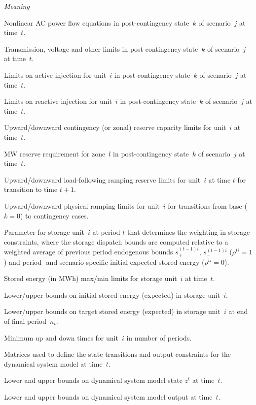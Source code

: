 \documentclass[12pt]{article}
\newcommand{\namelistlabel}[1]{\mbox{#1}\hfil}
\newenvironment{namelist}[1]{%
\begin{list}{}
  {
    \let\makelabel\namelistlabel
    \settowidth{\labelwidth}{#1}
    \setlength{\leftmargin}{1.1\labelwidth}
  }
 }{%
\end{list}}
\numberwithin{equation}{section}
\numberwithin{table}{section}
\numberwithin{figure}{section}
\begin{document}
\begin{namelist}{XXXXXXXXXX}
\item[]
\item[{\bf Constraint Functions and Parameters}]
\item[\emph{Symbol}] \emph{Meaning}
\item[$g^{tjk}(\cdot)$] Nonlinear AC power flow equations in post-contingency state~$k$ of scenario~$j$ at time~$t$.
\item[$h^{tjk}(\cdot)$] Transmission, voltage and other limits in post-contingency state~$k$ of scenario~$j$ at time~$t$.
\item[$P_{\rm min}^{tijk}, P_{\rm max}^{tijk}$] Limits on active injection for unit~$i$ in post-contingency state~$k$ of scenario~$j$ at time~$t$.
\item[$Q_{\rm min}^{tijk}, Q_{\rm max}^{tijk}$] Limits on reactive injection for unit~$i$ in post-contingency state~$k$ of scenario~$j$ at time~$t$.
\item[$R_{\rm max+}^{ti}, R_{\rm max-}^{ti}$] Upward/downward contingency (or zonal) reserve capacity limits for unit~$i$ at time~$t$.
\item[$R_l^{tjk}$] MW reserve requirement for zone~$l$ in post-contingency state~$k$ of scenario~$j$ at time~$t$.
\item[$\delta^{ti}_{\rm max+}, \delta^{ti}_{\rm max-}$] Upward/downward load-following ramping reserve limits for unit~$i$ at time $t$ for transition to time $t+1$.
\item[$\Delta_+^i, \Delta_-^i$] Upward/downward physical ramping limits for unit~$i$ for transitions from base ($k=0$) to contingency cases.
\item[$\rho^{ti}$] Parameter for storage unit~$i$ at period $t$ that determines the weighting in storage constraints, where the storage dispatch bounds are computed relative to a weighted average of previous period endogenous bounds $s_+^{(t-1)i}$, $s_-^{(t-1)i}$ ($\rho^{ti} = 1$) and period- and scenario-specific initial expected stored energy ($\rho^{ti} = 0$).
\item[$S^{ti}_{\rm max},S^{ti}_{\rm min}$] Stored energy (in MWh) max/min limits for storage unit~$i$ at time~$t$.
\item[$S_{\rm min}^{0i}$, $S_{\rm max}^{0i}$] Lower/upper bounds on initial stored energy (expected) in storage unit~$i$.
\item[$S_{\rm min}^{n_ti}$, $S_{\rm max}^{n_ti}$] Lower/upper bounds on target stored energy (expected) in storage unit~$i$ at end of final period~$n_t$.
\item[$\tau_i^+, \tau_i^-$] Minimum up and down times for unit~$i$ in number of periods.
\item[$A_{\rm ds}^t, B_{\rm ds}^t, C_{\rm ds}^t, D_{\rm ds}^t$] Matrices used to define the state transitions and output constraints for the dynamical system model at time~$t$.
\item[$z_{\rm min}^t, z_{\rm max}^t$] Lower and upper bounds on dynamical system model state $z^t$ at time~$t$.
\item[$y_{\rm min}^t, y_{\rm max}^t$] Lower and upper bounds on dynamical system model output at time~$t$.


\end{namelist}
\end{document}
